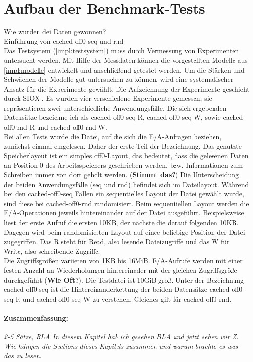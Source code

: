 \documentclass[
	12pt,
	a4paper,
	BCOR10mm,
	DIV14,
	listof=totoc,
	bibliography=totoc,
	headsepline
]{scrreprt}
\begin{document}
\section{Aufbau der Benchmark-Tests}
\label{benchmark}
Wie wurden dei Daten gewonnen?\\
Einführung von cached-off0-seq und rnd\\

Das Testsystem (\ref{impl:testsystem}) muss durch Vermessung von Experimenten untersucht werden. Mit Hilfe der Messdaten können die vorgestellten Modelle aus \ref{impl:modelle} entwickelt und anschließend getestet werden. Um die Stärken und Schwächen der Modelle gut untersuchen zu können, wird eine systematischer Ansatz für die Experimente gewählt. Die Aufzeichnung der Experimente geschieht durch SIOX \cite{UMLTPTPONI15}. Es wurden vier verschiedene Experimente gemessen, sie repräsentieren zwei unterschiedliche Anwendungsfälle. Die sich ergebenden Datensätze bezeichne ich als cached-off0-seq-R, cached-off0-seq-W, sowie cached-off0-rnd-R und cached-off0-rnd-W.\\
Bei allen Tests wurde die Datei, auf die sich die E/A-Anfragen beziehen, zunächst einmal eingelesen. Daher der erste Teil der Bezeichnung. Das genutzte Speicherlayout ist ein simples off0-Layout, das bedeutet, dass die gelesenen Daten an Position 0 des Arbeitsspeichers geschrieben werden, bzw. Informationen zum Schreiben immer von dort geholt werden. (\textbf{Stimmt das?})
Die Unterscheidung der beiden Anwendungsfälle (seq und rnd) befindet sich im Dateilayout. Während bei den cached-off0-seq Fällen ein sequentielles Layout der Datei gewählt wurde, sind diese bei cached-off0-rnd randomisiert. Beim sequentiellen Layout werden die E/A-Operationen jeweils hintereinander auf der Datei ausgeführt. Beispielsweise liest der erste Aufruf die ersten 10KB, der nächste die darauf folgenden 10KB. Dagegen wird beim randomisierten Layout auf einee beliebige Position der Datei zugegriffen. Das R steht für Read, also lesende Dateizugriffe und das W für Write, also schreibende Zugriffe.\\
Die Zugriffsgrößen variieren von 1KB bis 16MiB. E/A-Aufrufe werden mit einer festen Anzahl an Wiederholungen hintereinader mit der gleichen Zugriffsgröße durchgeführt (\textbf{Wie Oft?}). Die Testdatei ist 10GiB groß. Unter der Bezeichnung cached-off0-seq ist die Hintereinanderkettung der beiden Datensätze cached-off0-seq-R und cached-off0-seq-W zu verstehen. Gleiches gilt für cached-off0-rnd. 

\paragraph{Zusammenfassung:}
\textit{2-5 Sätze, BLA In diesem Kapitel hab ich gesehen BLA und jetzt sehen wir Z. Wie hängen die Sections dieses Kapitels zusammen und warum brachte es was das zu lesen.}\\
\end{document}

